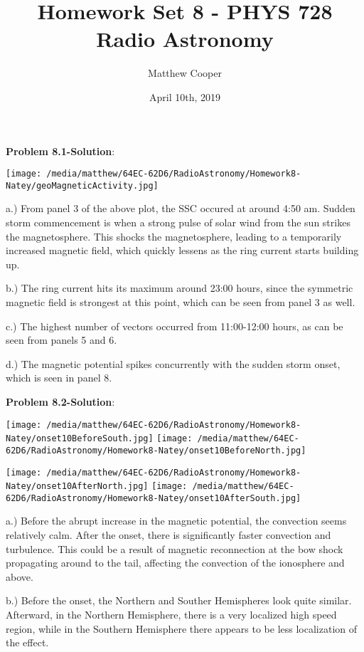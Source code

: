 \documentclass{article}
\title{Homework Set 8 - PHYS 728 Radio Astronomy}
\author{Matthew Cooper}
\date{April 10th, 2019}
\begin{document}
\begin{titlepage}
\maketitle
\end{titlepage}

\textbf{Problem 8.1-Solution}:

\smallskip
\texttt{[image: /media/matthew/64EC-62D6/RadioAstronomy/Homework8-Natey/geoMagneticActivity.jpg]}

a.)  From panel 3 of the above plot, the SSC occured at around 4:50 am.  Sudden storm commencement is when a strong pulse of solar wind from the sun strikes the magnetosphere.  This shocks the magnetosphere, leading to a temporarily increased magnetic field, which quickly lessens as the ring current starts building up.

b.)  The ring current hits its maximum around 23:00 hours, since the symmetric magnetic field is strongest at this point, which can be seen from panel 3 as well.

c.)  The highest number of vectors occurred from 11:00-12:00 hours, as can be seen from panels 5 and 6.

d.)  The magnetic potential spikes concurrently with the sudden storm onset, which is seen in panel 8.

\pagebreak
\textbf{Problem 8.2-Solution}:

\smallskip
\texttt{[image: /media/matthew/64EC-62D6/RadioAstronomy/Homework8-Natey/onset10BeforeSouth.jpg]}
\smallskip
\texttt{[image: /media/matthew/64EC-62D6/RadioAstronomy/Homework8-Natey/onset10BeforeNorth.jpg]}

\smallskip
\texttt{[image: /media/matthew/64EC-62D6/RadioAstronomy/Homework8-Natey/onset10AfterNorth.jpg]}
\smallskip
\texttt{[image: /media/matthew/64EC-62D6/RadioAstronomy/Homework8-Natey/onset10AfterSouth.jpg]}

a.) Before the abrupt increase in the magnetic potential, the convection seems relatively calm.  After the onset, there is significantly faster convection and turbulence.  This could be a result of magnetic reconnection at the bow shock propagating around to the tail, affecting the convection of the ionosphere and above.

b.) Before the onset, the Northern and Souther Hemispheres look quite similar.  Afterward, in the Northern Hemisphere, there is a very localized high speed region, while in the Southern Hemisphere there appears to be less localization of the effect.
\end{document}
